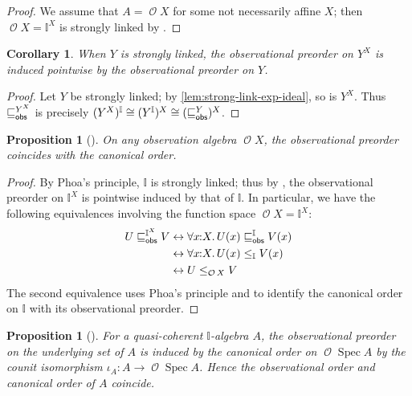 \documentclass[a4paper,12pt]{amsart}
\newtheorem{corollary}[theorem]{Corollary}
\newtheorem{proposition}[theorem]{Proposition}
\theoremstyle{definition}
\newcommand{\mc}[1]{\mathcal{#1}}
\newcommand{\mbb}[1]{\mathbb{#1}}
\newcommand{\I}{\mbb I}
\newcommand{\fa}[2]{\forall #1\!\colon\!\!#2\mathpunct{.}}
\newcommand{\eq}{\leftrightarrow}
\newcommand{\spec}{\operatorname{Spec}}
\newcommand{\opens}{\operatorname{\mc{O}}} %
\begin{document}
\begin{proof}
  We assume that $A=\opens{X}$ for some not necessarily affine $X$; then $\opens{X}=\I^X$ is strongly linked by .
\end{proof}


\begin{corollary}\label{cor:strong-link-obs-pw}
  When $Y$ is strongly linked, the observational preorder on $Y^X$ is induced pointwise by the observational preorder on $Y$.
\end{corollary}

\begin{proof}
  Let $Y$ be strongly linked; by \cref{lem:strong-link-exp-ideal}, so is $Y^X$. Thus $\obsle[Y^X]$ is precisely $(Y^X)^\I\cong (Y^\I)^X\cong (\obsle[Y])^X$.
\end{proof}

\begin{proposition}[\AxiomSQCP]\label{prop:specordopens}
  On any observation algebra $\opens{X}$, the observational preorder coincides with the canonical order.
\end{proposition}

\begin{proof}
  By Phoa's principle, $\I$ is strongly linked; thus by , the observational preorder on $\I^X$ is pointwise induced by that of $\I$. In particular, we have the following equivalences involving the function space $\opens{X}=\I^X$:
  \begin{align*}
    U\obsle[\I^X]V 
    &\eq \fa{x}{X} U(x)\obsle[\I] V(x)
    \\
    &\eq \fa{x}{X} U(x)\le_{\I} V(x)
    \\
    &\eq U\le_{\opens{X}} V \qedhere
  \end{align*}
  The second equivalence uses Phoa's principle and  to identify the canonical order on $\I$ with its observational preorder.
% 
\end{proof}

\begin{proposition}[\AxiomSQCP]\label{cor:specordonalgiscan}
  For a quasi-coherent $\I$-algebra $A$, the observational preorder on the underlying set of $A$ is induced by the canonical order on $\opens\spec{A}$ by the counit isomorphism $\iota_A\colon A\to \opens\spec{A}$. Hence the observational order and canonical order of $A$ coincide.
\end{proposition}
\end{document}
